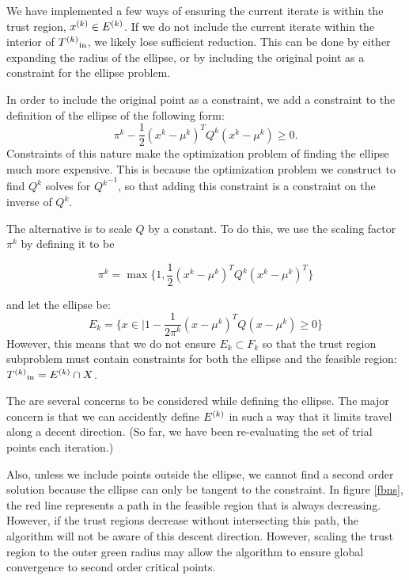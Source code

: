 We have implemented a few ways of ensuring the current iterate is within the trust region, ${x}^{(k)} \in {E^{(k)}}$.
If we do not include the current iterate within the interior of ${T^{(k)}}_{\text{in}}$, we likely lose sufficient reduction.
This can be done by either expanding the radius of the ellipse, or by including the original point as a constraint for the ellipse problem.


In order to include the original point as a constraint, we add a constraint to the definition of the ellipse of the following form:
$$ \pi^k - \frac 1 2 (x^k - \mu^{k})^TQ^{k}(x^k - \mu^{k}) \ge 0. $$
Constraints of this nature make the optimization problem of finding the ellipse much more expensive.
This is because the optimization problem we construct to find $Q^k$ solves for ${Q^k}^{-1}$, so that adding this constraint is a constraint on the inverse of $Q^k$.


The alternative is to scale $Q$ by a constant.
To do this, we use the scaling factor $\pi^k$ by defining it to be

$$\pi^k = \max \{1, \frac 1 {2} (x^{k} - \mu^{k})^T Q^k (x^{k} - \mu^{k})^T \}$$

and let the ellipse be:
$$E_k = \{x \in \mathbb | 1 - \frac 1 {2\pi^k} (x - \mu^{k})^T Q (x - \mu^{k}) \ge 0\} $$
However, this means that we do not ensure $E_k \subset F_k$ so that the trust region subproblem must contain constraints for both the ellipse and the feasible region: ${T^{(k)}}_{\text{in}} = {E^{(k)}} \cap X$.

The are several concerns to be considered while defining the ellipse.
The major concern is that we can accidently define ${E^{(k)}}$ in such a way that it limits travel along a decent direction.
(So far, we have been re-evaluating the set of trial points each iteration.)


Also, unless we include points outside the ellipse, we cannot find a second order solution because the ellipse can only be tangent to the constraint.
In figure \ref{fbns}, the red line represents a path in the feasible region that is always decreasing.
However, if the trust regions decrease without intersecting this path, the algorithm will not be aware of this descent direction.
However, scaling the trust region to the outer green radius may allow the algorithm to ensure global convergence to second order critical points.

